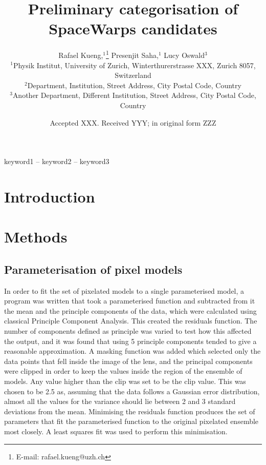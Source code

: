 \documentclass[a4paper,fleqn,usenatbib]{mnras}
\title[Short title, max. 45 characters]{Preliminary categorisation of SpaceWarps candidates}
\author[R. Kueng et al.]{
Rafael Kueng,$^{1}$\thanks{E-mail: rafael.kueng@uzh.ch}
Presenjit Saha,$^{1}$
Lucy Oswald$^{3}$
\\
$^{1}$Physik Institut, University of Zurich, Winterthurerstrasse XXX, Zurich 8057, Switzerland\\
$^{2}$Department, Institution, Street Address, City Postal Code, Country\\
$^{3}$Another Department, Different Institution, Street Address, City Postal Code, Country
}
\date{Accepted XXX. Received YYY; in original form ZZZ}
\begin{document}
\label{firstpage}
\pagerange{\pageref{firstpage}--\pageref{lastpage}}
\maketitle

\begin{abstract}

\end{abstract}

\begin{keywords}
keyword1 -- keyword2 -- keyword3
\end{keywords}


\section{Introduction}



\section{Methods}

\subsection{Parameterisation of pixel models}
In order to fit the set of pixelated models to a single parameterised model, a program was written that took a parameterised function and subtracted from it the mean and the principle components of the data, which were calculated using classical Principle Component Analysis.
This created the residuals function.
The number of components defined as principle was varied to test how this affected the output, and it was found that using 5 principle components tended to give a reasonable approximation.
A masking function was added which selected only the data points that fell inside the image of the lens, and the principal components were clipped in order to keep the values inside the region of the ensemble of models.
Any value higher than the clip was set to be the clip value.
This was chosen to be 2.5 as, assuming that the data follows a Gaussian error distribution, almost all the values for the variance should lie between 2 and 3 standard deviations from the mean.
Minimising the residuals function produces the set of parameters that fit the parameterised function to the original pixelated ensemble most closely.
A least squares fit was used to perform this minimisation.
\end{document}

